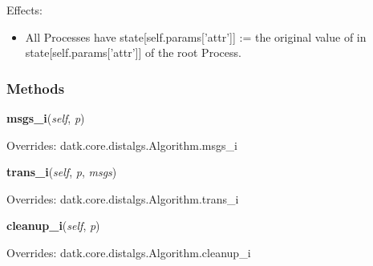 Effects:

\begin{itemize}
\setlength{\parskip}{0.6ex}
  \item All Processes have state[self.params['attr']] := the original value of 
    in state[self.params['attr']] of the root Process.

\end{itemize}



  \subsubsection{Methods}

    \vspace{0.5ex}

\hspace{.8\funcindent}\begin{boxedminipage}{\funcwidth}

    \raggedright \textbf{msgs\_i}(\textit{self}, \textit{p})

\setlength{\parskip}{2ex}
\setlength{\parskip}{1ex}
      Overrides: datk.core.distalgs.Algorithm.msgs\_i

    \end{boxedminipage}

    \vspace{0.5ex}

\hspace{.8\funcindent}\begin{boxedminipage}{\funcwidth}

    \raggedright \textbf{trans\_i}(\textit{self}, \textit{p}, \textit{msgs})

\setlength{\parskip}{2ex}
\setlength{\parskip}{1ex}
      Overrides: datk.core.distalgs.Algorithm.trans\_i

    \end{boxedminipage}

    \vspace{0.5ex}

\hspace{.8\funcindent}\begin{boxedminipage}{\funcwidth}

    \raggedright \textbf{cleanup\_i}(\textit{self}, \textit{p})

\setlength{\parskip}{2ex}
\setlength{\parskip}{1ex}
      Overrides: datk.core.distalgs.Algorithm.cleanup\_i

    \end{boxedminipage}


